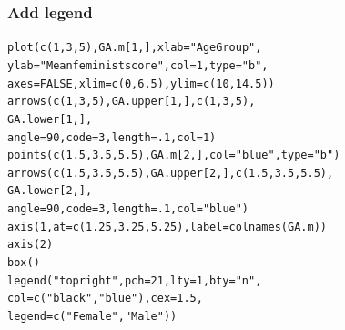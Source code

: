 \documentclass{beamer}\usepackage[]{graphicx}\usepackage[]{color}
\makeatletter
\newcommand{\hlnum}[1]{\textcolor[rgb]{0.533,0,0.133}{#1}}%
\newcommand{\hlstr}[1]{\textcolor[rgb]{0.667,0.267,0}{#1}}%
\newcommand{\hlstd}[1]{\textcolor[rgb]{0,0,0}{#1}}%
\newcommand{\hlkwc}[1]{\textcolor[rgb]{0,0,0.4}{#1}}%
\newcommand{\hlkwd}[1]{\textcolor[rgb]{0,0.267,0.4}{#1}}%
\newenvironment{kframe}{%
 \def\at@end@of@kframe{}%
 \ifinner\ifhmode%
  \def\at@end@of@kframe{\end{minipage}}%
  \begin{minipage}{\columnwidth}%
 \fi\fi%
 \def\FrameCommand##1{\hskip\@totalleftmargin \hskip-\fboxsep
 \colorbox{shadecolor}{##1}\hskip-\fboxsep
     \hskip-\linewidth \hskip-\@totalleftmargin \hskip\columnwidth}%
 \MakeFramed {\advance\hsize-\width
   \@totalleftmargin\z@ \linewidth\hsize
   \@setminipage}}%
 {\par\unskip\endMakeFramed%
 \at@end@of@kframe}
\newenvironment{knitrout}{}{} %
\makeatother
\begin{document}
\begin{frame}[fragile]
  \frametitle{Add legend}
\begin{knitrout}
\color{fgcolor}\begin{kframe}
\begin{alltt}
\hlkwd{plot}\hlstd{(}\hlkwd{c}\hlstd{(}\hlnum{1}\hlstd{,} \hlnum{3}\hlstd{,} \hlnum{5}\hlstd{), GA.m[}\hlnum{1}\hlstd{, ],} \hlkwc{xlab} \hlstd{=} \hlstr{"Age Group"}\hlstd{,}
     \hlkwc{ylab} \hlstd{=} \hlstr{"Mean feminist score"}\hlstd{,}\hlkwc{col} \hlstd{=} \hlnum{1}\hlstd{,} \hlkwc{type} \hlstd{=} \hlstr{"b"}\hlstd{,}
     \hlkwc{axes} \hlstd{=} \hlnum{FALSE}\hlstd{,} \hlkwc{xlim} \hlstd{=} \hlkwd{c}\hlstd{(}\hlnum{0}\hlstd{,} \hlnum{6.5}\hlstd{),} \hlkwc{ylim} \hlstd{=} \hlkwd{c}\hlstd{(}\hlnum{10}\hlstd{,} \hlnum{14.5}\hlstd{))}
\hlkwd{arrows}\hlstd{(}\hlkwd{c}\hlstd{(}\hlnum{1}\hlstd{,} \hlnum{3}\hlstd{,} \hlnum{5}\hlstd{), GA.upper[}\hlnum{1}\hlstd{, ],} \hlkwd{c}\hlstd{(}\hlnum{1}\hlstd{,} \hlnum{3}\hlstd{,} \hlnum{5}\hlstd{),}
       \hlstd{GA.lower[}\hlnum{1}\hlstd{, ],}
       \hlkwc{angle} \hlstd{=} \hlnum{90}\hlstd{,} \hlkwc{code} \hlstd{=} \hlnum{3}\hlstd{,} \hlkwc{length} \hlstd{=} \hlnum{.1}\hlstd{,} \hlkwc{col} \hlstd{=} \hlnum{1}\hlstd{)}
\hlkwd{points}\hlstd{(}\hlkwd{c}\hlstd{(}\hlnum{1.5}\hlstd{,} \hlnum{3.5}\hlstd{,} \hlnum{5.5}\hlstd{),GA.m[}\hlnum{2}\hlstd{, ],} \hlkwc{col} \hlstd{=} \hlstr{"blue"}\hlstd{,} \hlkwc{type} \hlstd{=} \hlstr{"b"}\hlstd{)}
\hlkwd{arrows}\hlstd{(}\hlkwd{c}\hlstd{(}\hlnum{1.5}\hlstd{,} \hlnum{3.5}\hlstd{,} \hlnum{5.5}\hlstd{), GA.upper[}\hlnum{2}\hlstd{, ],} \hlkwd{c}\hlstd{(}\hlnum{1.5}\hlstd{,} \hlnum{3.5}\hlstd{,} \hlnum{5.5}\hlstd{),}
       \hlstd{GA.lower[}\hlnum{2}\hlstd{, ],}
       \hlkwc{angle} \hlstd{=} \hlnum{90}\hlstd{,} \hlkwc{code} \hlstd{=} \hlnum{3}\hlstd{,} \hlkwc{length} \hlstd{=} \hlnum{.1}\hlstd{,} \hlkwc{col} \hlstd{=} \hlstr{"blue"}\hlstd{)}
\hlkwd{axis}\hlstd{(}\hlnum{1}\hlstd{,} \hlkwc{at} \hlstd{=} \hlkwd{c}\hlstd{(}\hlnum{1.25}\hlstd{,} \hlnum{3.25}\hlstd{,} \hlnum{5.25}\hlstd{),} \hlkwc{label} \hlstd{=} \hlkwd{colnames}\hlstd{(GA.m))}
\hlkwd{axis}\hlstd{(}\hlnum{2}\hlstd{)}
\hlkwd{box}\hlstd{()}
\hlkwd{legend}\hlstd{(}\hlstr{"topright"}\hlstd{,} \hlkwc{pch} \hlstd{=} \hlnum{21}\hlstd{,} \hlkwc{lty} \hlstd{=} \hlnum{1}\hlstd{,} \hlkwc{bty} \hlstd{=} \hlstr{"n"}\hlstd{,}
       \hlkwc{col} \hlstd{=} \hlkwd{c}\hlstd{(}\hlstr{"black"}\hlstd{,} \hlstr{"blue"}\hlstd{),} \hlkwc{cex} \hlstd{=} \hlnum{1.5}\hlstd{,}
       \hlkwc{legend} \hlstd{=} \hlkwd{c}\hlstd{(}\hlstr{"Female"}\hlstd{,} \hlstr{"Male"}\hlstd{))}
\end{alltt}
\end{kframe}
\end{knitrout}
\end{frame} 
\end{document}
